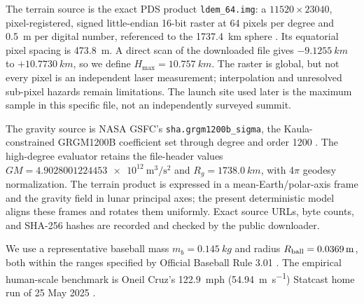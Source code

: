 The terrain source is the exact PDS product \texttt{ldem\_64.img}: a \(11520\times23040\), pixel-registered, signed little-endian 16-bit raster at 64 pixels per degree and \SI{0.5}{m} per digital number, referenced to the \SI{1737.4}{km} sphere \cite{Smith2010,PDSLOLA}. Its equatorial pixel spacing is \SI{473.8}{m}. A direct scan of the downloaded file gives \(-\SI{9.1255}{km}\) to \(+\SI{10.7730}{km}\), so we define \(H_{\max}=\SI{10.757}{km}\). The raster is global, but not every pixel is an independent laser measurement; interpolation and unresolved sub-pixel hazards remain limitations. The launch site used later is the maximum sample in this specific file, not an independently surveyed summit.

The gravity source is NASA GSFC's \texttt{sha.grgm1200b\_sigma}, the Kaula-constrained GRGM1200B coefficient set through degree and order 1200 \cite{Goossens2020,PGDAGRGM1200B}. The high-degree evaluator retains the file-header values \(GM=\SI{4.9028001224453e12}{\metre^3\per\square\second}\) and \(R_g=\SI{1738.0}{km}\), with 4\(\pi\) geodesy normalization. The terrain product is expressed in a mean-Earth/polar-axis frame and the gravity field in lunar principal axes; the present deterministic model aligns these frames and rotates them uniformly. Exact source URLs, byte counts, and SHA-256 hashes are recorded and checked by the public downloader.

We use a representative baseball mass \(m_b=\SI{0.145}{kg}\) and radius \(R_{\rm ball}=\SI{0.0369}{m}\), both within the ranges specified by Official Baseball Rule 3.01 \cite{MLBRules2026}. The empirical human-scale benchmark is Oneil Cruz's \SI{122.9}{mph} (\SI{54.94}{\metre\per\second}) Statcast home run of 25 May 2025 \cite{MLBCruz2025}.


